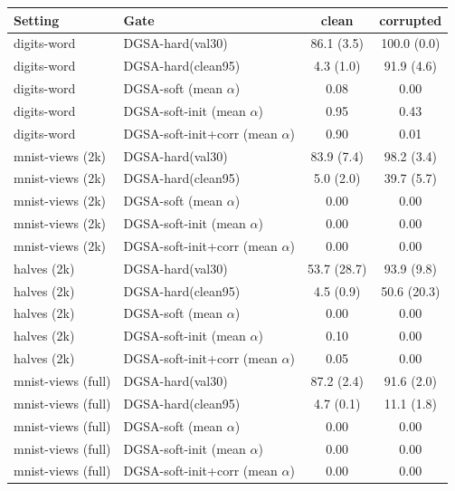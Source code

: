 \small
\begin{tabular}{llcc}
\toprule
Setting & Gate & clean & corrupted \\
\midrule
digits-word & DGSA-hard(val30) & 86.1 (3.5) & 100.0 (0.0) \\
digits-word & DGSA-hard(clean95) & 4.3 (1.0) & 91.9 (4.6) \\
digits-word & DGSA-soft (mean $\alpha$) & 0.08 & 0.00 \\
digits-word & DGSA-soft-init (mean $\alpha$) & 0.95 & 0.43 \\
digits-word & DGSA-soft-init+corr (mean $\alpha$) & 0.90 & 0.01 \\
mnist-views (2k) & DGSA-hard(val30) & 83.9 (7.4) & 98.2 (3.4) \\
mnist-views (2k) & DGSA-hard(clean95) & 5.0 (2.0) & 39.7 (5.7) \\
mnist-views (2k) & DGSA-soft (mean $\alpha$) & 0.00 & 0.00 \\
mnist-views (2k) & DGSA-soft-init (mean $\alpha$) & 0.00 & 0.00 \\
mnist-views (2k) & DGSA-soft-init+corr (mean $\alpha$) & 0.00 & 0.00 \\
halves (2k) & DGSA-hard(val30) & 53.7 (28.7) & 93.9 (9.8) \\
halves (2k) & DGSA-hard(clean95) & 4.5 (0.9) & 50.6 (20.3) \\
halves (2k) & DGSA-soft (mean $\alpha$) & 0.00 & 0.00 \\
halves (2k) & DGSA-soft-init (mean $\alpha$) & 0.10 & 0.00 \\
halves (2k) & DGSA-soft-init+corr (mean $\alpha$) & 0.05 & 0.00 \\
mnist-views (full) & DGSA-hard(val30) & 87.2 (2.4) & 91.6 (2.0) \\
mnist-views (full) & DGSA-hard(clean95) & 4.7 (0.1) & 11.1 (1.8) \\
mnist-views (full) & DGSA-soft (mean $\alpha$) & 0.00 & 0.00 \\
mnist-views (full) & DGSA-soft-init (mean $\alpha$) & 0.00 & 0.00 \\
mnist-views (full) & DGSA-soft-init+corr (mean $\alpha$) & 0.00 & 0.00 \\
\bottomrule
\end{tabular}
